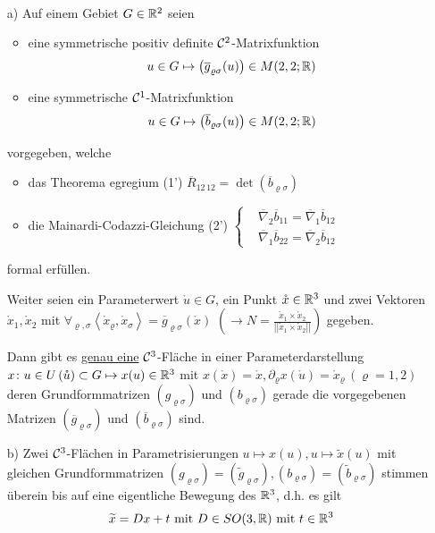 \setcounter{set}{3}
\begin{satz}\label{satz254}\(\)
 \begin{enumerate}
  \item[a)] Auf einem Gebiet \(G \in \mathbb{R}^2\) seien
  \begin{itemize}
   \item eine symmetrische positiv definite \(\mathcal{C}^2\)-Matrixfunktion
   \[    u \in G \mapsto \big(\overline g_{\varrho \sigma}(u)\big) \in M(2,2;\mathbb{R})
   \]
   \item eine symmetrische \(\mathcal{C}^1\)-Matrixfunktion
   \[
    u \in G \mapsto \big(\overline b_{\varrho \sigma}(u)\big) \in M(2,2;\mathbb{R})
   \]
  \end{itemize}
  vorgegeben, welche
  \begin{itemize}
   \item das Theorema egregium (1') \(\overline R_{12 \, 12} = \det (\overline b_{\varrho \sigma})\)
   \item die Mainardi-Codazzi-Gleichung (2') \(\begin{cases}
                                                &\overline \nabla_2 \overline b_{11} = \overline \nabla_1 \overline b_{12} \\
                                                &\overline \nabla_1 \overline b_{22} = \overline \nabla_2 \overline b_{12}
                                               \end{cases}\) 
  \end{itemize}
  formal erfüllen. \par
  Weiter seien ein Parameterwert \(\mathring u \in G\), ein Punkt \(\mathring x \in \mathbb{R}^3\) und zwei Vektoren \(\mathring x_1, \mathring x_2\) mit \(\forall_{\varrho, \sigma} \left\langle \mathring x_\varrho, \mathring x_\sigma \right\rangle = \overline g_{\varrho \sigma} \left(\mathring x\right)\)  \(\left( \to N = \frac{\mathring x_1 \times \mathring x_2}{\left|\left|\mathring x_1 \times \mathring x_2 \right|\right|}\right)\) gegeben. \par
  Dann gibt es \uline{genau eine} \(\mathcal{C}^3\)-Fläche in einer Parameterdarstellung \(x \colon u \in U\left(\mathring u\right) \subset G \mapsto x(u) \in \mathbb{R}^3\) mit \(x\left(\mathring x\right) = \mathring x, \partial_\varrho x\left(\mathring u\right) = \mathring x_\varrho \, (\varrho = 1,2)\) deren Grundformmatrizen \((g_{\varrho \sigma})\) und \((b_{\varrho \sigma})\) gerade die vorgegebenen Matrizen \(\left(\overline g_{\varrho \sigma}\right)\) und \(\left(\overline b_{\varrho \sigma}\right)\) sind.
  \item[b)] Zwei \(\mathcal{C}^3\)-Flächen in Parametrisierungen \(u \mapsto x(u), u \mapsto \widetilde x(u)\) mit gleichen Grundformmatrizen \((g_{\varrho \sigma}) =(\widetilde g_{\varrho \sigma}), (b_{\varrho \sigma}) = (\widetilde b_{\varrho \sigma})\) stimmen überein bis auf eine eigentliche Bewegung des \(\mathbb{R}^3\), d.h. es gilt
  \[
   \widetilde x = Dx + t \text{ mit } D \in SO(3,\mathbb{R}) \text{ mit } t \in \mathbb{R}^3
  \]
 \end{enumerate}
\end{satz}

